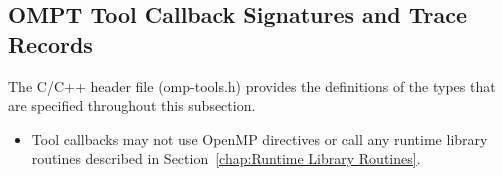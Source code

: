 %
%
%
%
%
%
%
%
%
%
%
%
%


\subsection{OMPT Tool Callback Signatures and Trace Records}
\label{sec:ompt-tool-callbacks}

The C/C++ header file (omp-tools.h) provides the definitions of 
the types that are specified throughout this subsection.

\restrictions
\begin{itemize}
\item Tool callbacks may not use OpenMP directives or call any runtime 
      library routines described in Section~\ref{chap:Runtime Library Routines}.
\end{itemize}

